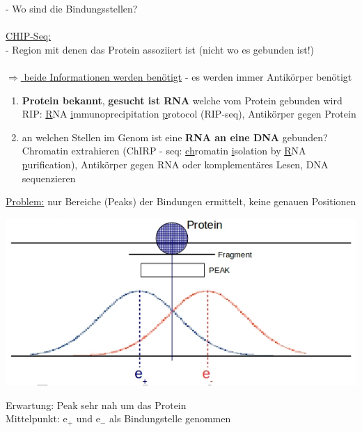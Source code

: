  - Wo sind die Bindungsstellen?
\\\\
\underline{CHIP-Seq:}\\
 - Region mit denen das Protein assoziiert ist (nicht wo es gebunden ist!)
\\\\
\underline{$\Rightarrow$ beide Informationen werden benötigt} - es werden immer Antikörper benötigt

\begin{enumerate}
	\item \textbf{Protein bekannt}, \textbf{gesucht ist RNA} welche vom Protein gebunden wird\\
	RIP: \underline{R}NA \underline{i}mmunoprecipitation \underline{p}rotocol (RIP-seq), Antikörper gegen Protein
	\item an welchen Stellen im Genom ist eine \textbf{RNA an eine DNA} gebunden?\\
	Chromatin extrahieren (ChIRP - seq: \underline{ch}romatin \underline{i}solation by \underline{R}NA \underline{p}urification), Antikörper gegen RNA oder komplementäres Lesen, DNA sequenzieren
\end{enumerate}

\underline{Problem:} nur Bereiche (Peaks) der Bindungen ermittelt, keine genauen Positionen
\begin{center}
\includegraphics[scale=0.75]{lectures/160415/pix/result.jpg}
\end{center}
Erwartung: Peak sehr nah um das Protein\\
Mittelpunkt: e$_{+}$ und e$_{-}$ als Bindungstelle genommen